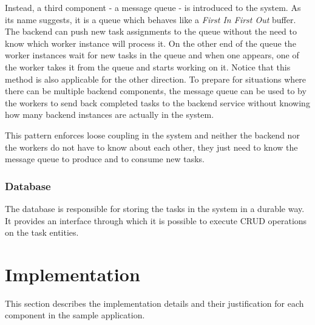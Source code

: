 Instead, a third component - a message queue - is introduced to the system. As its name suggests, it is a queue which behaves like a \emph{First In First Out} buffer. The backend can push new task assignments to the queue without the need to know which worker instance will process it. On the other end of the queue the worker instances wait for new tasks in the queue and when one appears, one of the worker takes it from the queue and starts working on it. Notice that this method is also applicable for the other direction. To prepare for situations where there can be multiple backend components, the message queue can be used to by the workers to send back completed tasks to the backend service without knowing how many backend instances are actually in the system.

This pattern enforces loose coupling in the system and neither the backend nor the workers do not have to know about each other, they just need to know the message queue to produce and to consume new tasks. 

\subsubsection{Database}


The database is responsible for storing the tasks in the system in a durable way. It provides an interface through which it is possible to execute CRUD operations on the task entities.

\section{Implementation}

This section describes the implementation details and their justification for each component in the sample application.



